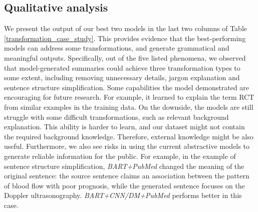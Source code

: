\documentclass[letterpaper, table]{article} %
\begin{document}
\subsection{Qualitative analysis}
We present the output of our best two models in the last two columns of Table \ref{transformation_case_study}.
This provides evidence that the best-performing models can address some transformations, and generate grammatical and meaningful outputs.
Specifically, out of the five listed phenomena, we observed that model-generated summaries could achieve three transformation types to some extent, including removing unnecessary details, jargon explanation and sentence structure simplification.
Some capabilities the model demonstrated are encouraging for future research.
For example, it learned to explain the term RCT from similar examples in the training data.  On the downside, the  models are still struggle with some difficult transformations, such as relevant background explanation. This ability is harder to learn, and our dataset might not contain the required background knowledge.
Therefore, external knowledge might be also useful.
Furthermore, we also see risks in using the current abstractive models to generate reliable information for the public. For example, in the example of sentence structure simplification, \textit{BART+PubMed} changed the meaning of the original sentence: the source sentence claims an association between the pattern of blood flow with poor prognosis, while the generated sentence focuses on the Doppler ultrasonography. \textit{BART+CNN/DM+PubMed}
performs better in this case.
\end{document}
